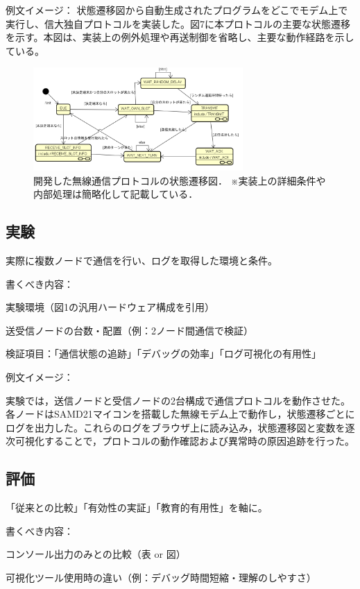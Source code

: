 \documentclass[technicalreport]{ieicej}
\begin{document}
例文イメージ：
状態遷移図から自動生成されたプログラムをどこでモデム上で実行し、信大独自プロトコルを実装した。図7に本プロトコルの主要な状態遷移を示す。本図は、実装上の例外処理や再送制御を省略し、主要な動作経路を示している。
\begin{figure}[b]
  \centering
  \includegraphics[width=80mm]{./images/protocol-state-machine3.png}
  \caption{開発した無線通信プロトコルの状態遷移図．
※実装上の詳細条件や内部処理は簡略化して記載している．}
  \label{fig:protocol-state-machine}
\end{figure}

\subsection{実験}
実際に複数ノードで通信を行い、ログを取得した環境と条件。

書くべき内容：

実験環境（図1の汎用ハードウェア構成を引用）

送受信ノードの台数・配置（例：2ノード間通信で検証）

検証項目：「通信状態の追跡」「デバッグの効率」「ログ可視化の有用性」

例文イメージ：

実験では，送信ノードと受信ノードの2台構成で通信プロトコルを動作させた。各ノードはSAMD21マイコンを搭載した無線モデム上で動作し，状態遷移ごとにログを出力した。これらのログをブラウザ上に読み込み，状態遷移図と変数を逐次可視化することで，プロトコルの動作確認および異常時の原因追跡を行った。

\subsection{評価}
「従来との比較」「有効性の実証」「教育的有用性」を軸に。

書くべき内容：

コンソール出力のみとの比較（表 or 図）

可視化ツール使用時の違い（例：デバッグ時間短縮・理解のしやすさ）
\end{document}

